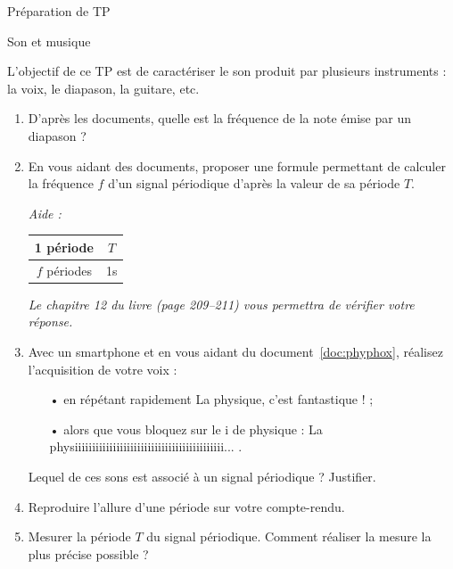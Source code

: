 \documentclass[12pt,a4paper]{article}
\begin{document}
\begin{header}
Préparation de TP

Son et musique
\end{header}

L'objectif de ce TP est de caractériser le son produit par plusieurs instruments : la voix, le diapason, la guitare, etc.

\begin{enumerate}
\item \app{}
\label{quest:diapason}

D'après les documents, quelle est la fréquence de la note émise par un diapason ?

\item \app{}

En vous aidant des documents, proposer une formule permettant de calculer la fréquence $f$ d'un signal périodique d'après la valeur de sa période $T$.

\emph{Aide :}
\begin{center}
\begin{tabular}{c|c}
1 période & $T$ \\
\hline
$f$ périodes & \unit{1}{s}
\end{tabular}
\end{center}
\emph{Le chapitre 12 du livre (page 209--211) vous permettra de vérifier votre réponse.}

\item \rea{} \anarai{}

Avec un smartphone et en vous aidant du document~\ref{doc:phyphox}, réalisez l'acquisition de votre voix : 
\begin{itemize}
\item[•] en répétant rapidement \og La physique, c'est fantastique !\fg{} ;
\item[•] alors que vous bloquez sur le \og i \fg{} de physique : \og La physiiiiiiiiiiiiiiiiiiiiiiiiiiiiiiiiiiiiiiiiiii... \fg{}.
\end{itemize}
Lequel de ces sons est associé à un signal périodique ?
Justifier.

\item \rea{}

Reproduire l'allure d'une période sur votre compte-rendu.

\item \rea{}

Mesurer la période $T$ du signal périodique.
Comment réaliser la mesure la plus précise possible ?
\end{enumerate}
\end{document}
